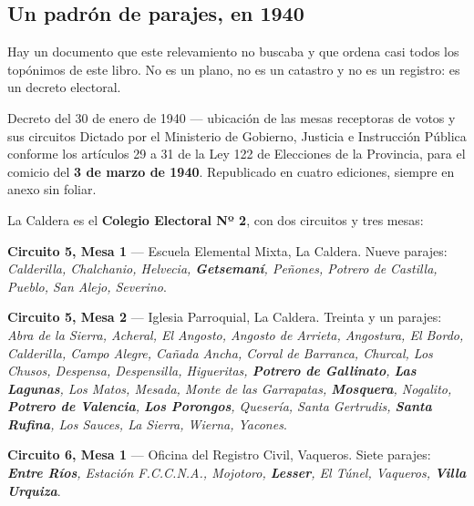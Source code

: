 \subsection*{Un padrón de parajes, en 1940}

Hay un documento que este relevamiento no buscaba y que ordena casi todos los topónimos de
este libro. No es un plano, no es un catastro y no es un registro: es un decreto electoral.

\begin{ficha}{Decreto del 30 de enero de 1940 --- ubicación de las mesas receptoras de votos y sus circuitos}
Dictado por el Ministerio de Gobierno, Justicia e Instrucción Pública conforme los artículos
29 a 31 de la Ley 122 de Elecciones de la Provincia, para el comicio del \textbf{3 de marzo de
1940}. Republicado en cuatro ediciones, siempre en anexo sin foliar.

La Caldera es el \textbf{Colegio Electoral Nº 2}, con dos circuitos y tres mesas:

\textbf{Circuito 5, Mesa 1} --- Escuela Elemental Mixta, La Caldera. Nueve parajes:
\textit{Calderilla, Chalchanio, Helvecia, \textbf{Getsemaní}, Peñones, Potrero de Castilla,
Pueblo, San Alejo, Severino}.

\textbf{Circuito 5, Mesa 2} --- Iglesia Parroquial, La Caldera. Treinta y un parajes:
\textit{Abra de la Sierra, Acheral, El Angosto, Angosto de Arrieta, Angostura, El Bordo,
Calderilla, Campo Alegre, Cañada Ancha, Corral de Barranca, Churcal, Los Chusos, Despensa,
Despensilla, Higueritas, \textbf{Potrero de Gallinato}, \textbf{Las Lagunas}, Los Matos,
Mesada, Monte de las Garrapatas, \textbf{Mosquera}, Nogalito, \textbf{Potrero de Valencia},
\textbf{Los Porongos}, Quesería, Santa Gertrudis, \textbf{Santa Rufina}, Los Sauces, La Sierra,
Wierna, Yacones}.

\textbf{Circuito 6, Mesa 1} --- Oficina del Registro Civil, Vaqueros. Siete parajes:
\textit{\textbf{Entre Ríos}, Estación F.C.C.N.A., Mojotoro, \textbf{Lesser}, El Túnel,
Vaqueros, \textbf{Villa Urquiza}}.
\end{ficha}

